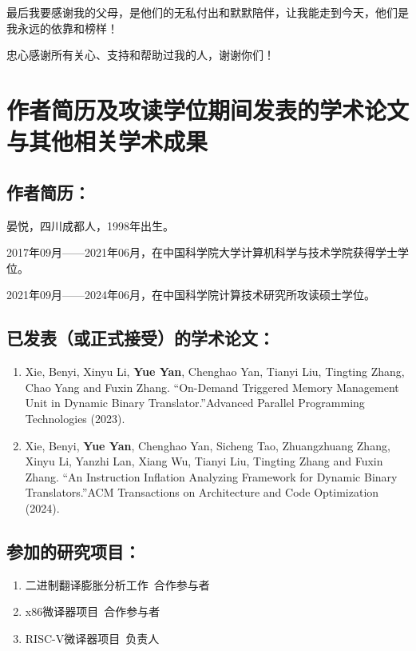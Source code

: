 最后我要感谢我的父母，是他们的无私付出和默默陪伴，让我能走到今天，他们是我永远的依靠和榜样！

忠心感谢所有关心、支持和帮助过我的人，谢谢你们！

\chapter{作者简历及攻读学位期间发表的学术论文与其他相关学术成果}

\section*{作者简历：}
晏悦，四川成都人，1998年出生。

2017年09月——2021年06月，在中国科学院大学计算机科学与技术学院获得学士学位。

2021年09月——2024年06月，在中国科学院计算技术研究所攻读硕士学位。

\section*{已发表（或正式接受）的学术论文：}

{
\setlist[enumerate]{}%
\begin{enumerate}[nosep]
    \item Xie, Benyi, Xinyu Li, \textbf{Yue Yan}, Chenghao Yan, Tianyi Liu, Tingting Zhang, Chao
    Yang and Fuxin Zhang. “On-Demand Triggered Memory Management Unit
    in Dynamic Binary Translator.”Advanced Parallel Programming Technologies
    (2023).

    \item Xie, Benyi, \textbf{Yue Yan}, Chenghao Yan, Sicheng Tao, Zhuangzhuang Zhang, Xinyu
    Li, Yanzhi Lan, Xiang Wu, Tianyi Liu, Tingting Zhang and Fuxin Zhang.
    “An Instruction Inflation Analyzing Framework for Dynamic Binary Translators.”ACM
    Transactions on Architecture and Code Optimization (2024).
\end{enumerate}
}


\section*{参加的研究项目：}
\begin{enumerate}[nosep]
    \item 二进制翻译膨胀分析工作\ 合作参与者
    \item x86微译器项目\ 合作参与者
    \item RISC-V微译器项目\ 负责人
\end{enumerate}


